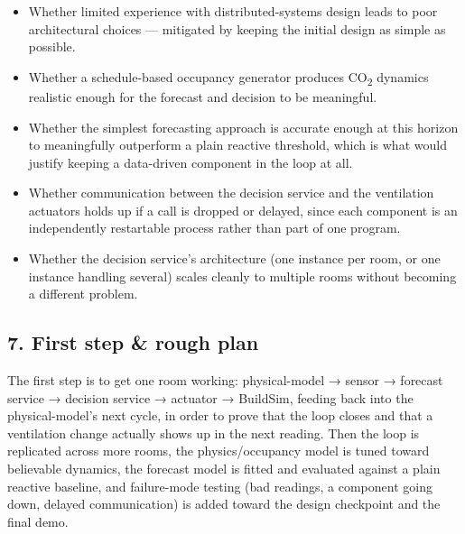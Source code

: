 \documentclass[
  11pt,
]{article}
\providecommand{\tightlist}{%
  \setlength{\itemsep}{0pt}\setlength{\parskip}{0pt}}
\begin{document}
\begin{itemize}
\tightlist
\item
  Whether limited experience with distributed-systems design leads to poor architectural 
  choices --- mitigated by keeping the initial design as simple as possible.
\item
  Whether a schedule-based occupancy generator produces CO\textsubscript{2} dynamics
  realistic enough for the forecast and decision to be meaningful.
\item
  Whether the simplest forecasting approach is accurate enough at this
  horizon to meaningfully outperform a plain reactive threshold, which is
  what would justify keeping a data-driven component in the loop at all.
\item
  Whether communication between the decision service and the ventilation
  actuators holds up if a call is dropped or delayed, since each
  component is an independently restartable process rather than part of
  one program.
\item
  Whether the decision service's architecture (one instance per room, or
  one instance handling several) scales cleanly to multiple rooms without
  becoming a different problem.
\end{itemize}

\subsection{7. First step \& rough plan}\label{first-step-rough-plan}

The first step is to get one room working: physical-model → sensor →
forecast service → decision service → actuator → BuildSim, feeding back into
the physical-model's next cycle, in order to prove that the loop closes and
that a ventilation change actually shows up in the next reading. Then the
loop is replicated across more rooms,
the physics/occupancy model is tuned toward believable dynamics, the
forecast model is fitted and evaluated against a plain reactive baseline,
and failure-mode testing (bad readings, a component going down, delayed
communication) is added toward the design checkpoint and the final demo.
\end{document}
